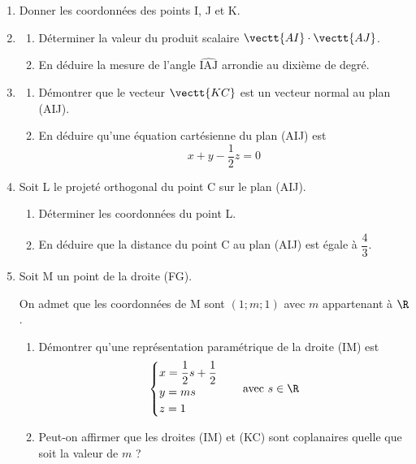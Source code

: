 	\begin{enumerate}
		\item Donner les coordonnées des points I, J et K.
		
		\item \begin{enumerate}
			\item Déterminer la valeur du produit scalaire $\vectt{AI}\cdot\vectt{AJ}$.
			
			\item En déduire la mesure de l'angle $\widehat{\mathrm{IAJ}}$ arrondie au dixième de degré.
		\end{enumerate}
		
		\item \begin{enumerate}
			\item Démontrer que le vecteur $\vectt{KC}$ est un vecteur normal au plan (AIJ).
			
			\item En déduire qu'une équation cartésienne du plan (AIJ) est \quad  \[x+y-\dfrac{1}{2}z=0\]
		\end{enumerate}
		
		\item Soit L le projeté orthogonal du point C sur le plan (AIJ).
		\begin{enumerate}
			\item Déterminer les coordonnées du point L.
			
			\item En déduire que la distance du point C au plan (AIJ) est égale à $\dfrac{4}{3}$.
		\end{enumerate}
		
		\item Soit M un point de la droite (FG).
		
		On admet que les coordonnées de M sont $(1 ; m ; 1)$ avec $m$ appartenant à $\R$.
		
		\begin{enumerate}
			\item Démontrer qu'une représentation paramétrique de la droite (IM) est
			\[\begin{cases}
				x=\dfrac{1}{2} s+\dfrac{1}{2} \\
				y=m s \\
				z=1
			\end{cases} \quad \text{avec } s \in \R\]
			
			\item Peut-on affirmer que les droites (IM) et (KC) sont coplanaires quelle que soit la valeur de $m$ ?
		\end{enumerate}
	\end{enumerate}
